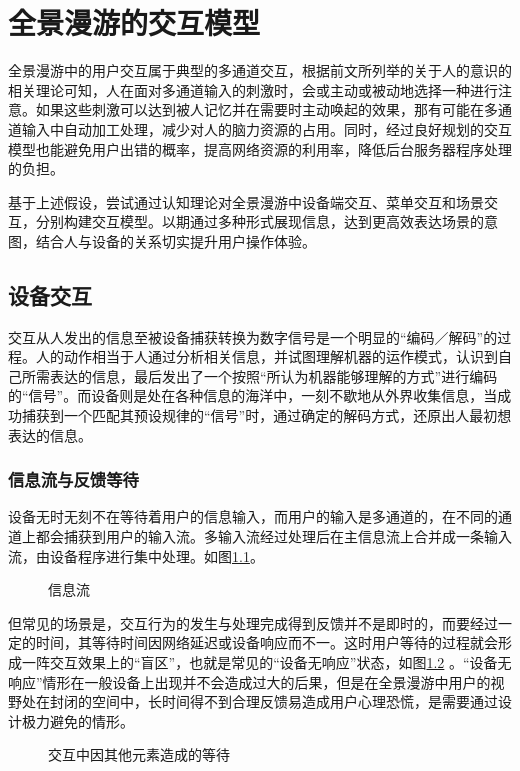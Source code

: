 \chapter{全景漫游的交互模型}
全景漫游中的用户交互属于典型的多通道交互，根据前文所列举的关于人的意识的相关理论可知，人在面对多通道输入的刺激时，会或主动或被动地选择一种进行注意。如果这些刺激可以达到被人记忆并在需要时主动唤起的效果，那有可能在多通道输入中自动加工处理，减少对人的脑力资源的占用。同时，经过良好规划的交互模型也能避免用户出错的概率，提高网络资源的利用率，降低后台服务器程序处理的负担。

基于上述假设，尝试通过认知理论对全景漫游中设备端交互、菜单交互和场景交互，分别构建交互模型。以期通过多种形式展现信息，达到更高效表达场景的意图，结合人与设备的关系切实提升用户操作体验。

\section{设备交互}
交互从人发出的信息至被设备捕获转换为数字信号是一个明显的“编码／解码”的过程。人的动作相当于人通过分析相关信息，并试图理解机器的运作模式，认识到自己所需表达的信息，最后发出了一个按照“所认为机器能够理解的方式”进行编码的“信号”。而设备则是处在各种信息的海洋中，一刻不歇地从外界收集信息，当成功捕获到一个匹配其预设规律的“信号”时，通过确定的解码方式，还原出人最初想表达的信息。

\subsection{信息流与反馈等待}
设备无时无刻不在等待着用户的信息输入，而用户的输入是多通道的，在不同的通道上都会捕获到用户的输入流。多输入流经过处理后在主信息流上合并成一条输入流，由设备程序进行集中处理。如图\ref{fig:reactive}。

\begin{figure}[htp]
\centering
{}
\caption{信息流}
\label{fig:reactive}
\end{figure}

但常见的场景是，交互行为的发生与处理完成得到反馈并不是即时的，而要经过一定的时间，其等待时间因网络延迟或设备响应而不一。这时用户等待的过程就会形成一阵交互效果上的“盲区”，也就是常见的“设备无响应”状态，如图\ref{fig:stream}	。“设备无响应”情形在一般设备上出现并不会造成过大的后果，但是在全景漫游中用户的视野处在封闭的空间中，长时间得不到合理反馈易造成用户心理恐慌，是需要通过设计极力避免的情形。

\begin{figure}[htp]
\centering
{}
\caption{交互中因其他元素造成的等待}
\label{fig:stream}
\end{figure}

